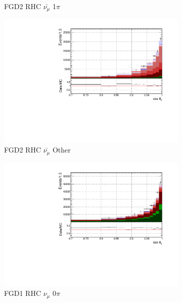 \begin{figure}
\begin{subfigure}{.32\textwidth}
  \caption{FGD2 RHC $\bar{\nu_{\mu}}$ 1$\pi$}
  \label{fig:tstack_FGD2_anti-numuCC_1pi}
\end{subfigure}
\begin{subfigure}{.32\textwidth}
  \centering
  \includegraphics[width=0.95\linewidth]{figs/FGD2_anti-numuCC_other_t}
  \caption{FGD2 RHC $\bar{\nu_{\mu}}$ Other}
  \label{fig:tstack_FGD2_anti-numuCC_other}
\end{subfigure}
\begin{subfigure}{.32\textwidth}
  \centering
  \includegraphics[width=0.95\linewidth]{figs/FGD1_NuMuBkg_CC0pi_in_AntiNu_Mode_t}
  \caption{FGD1 RHC $\nu_{\mu}$ 0$\pi$}
  \label{fig:tstack_FGD1_NuMuBkg_CC0pi_in_AntiNu_Mode}
\end{subfigure}
\begin{subfigure}{.32\textwidth}
  \centering

\end{subfigure}
\end{figure}

